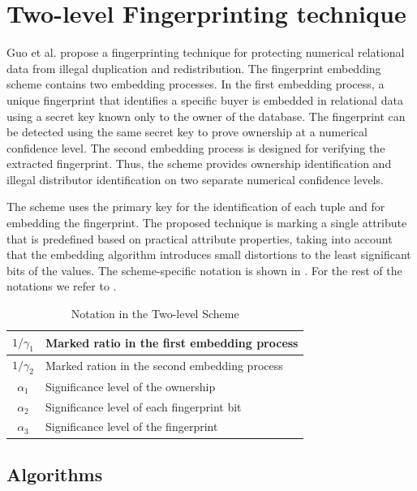 \section{Two-level Fingerprinting technique}\label{sec:two-level-fp}
Guo et al. \cite{guo2006fingerprinting} propose a fingerprinting technique for protecting numerical relational data from illegal duplication and redistribution. 
The fingerprint embedding scheme contains two embedding processes. 
In the first embedding process, a unique fingerprint that identifies a specific buyer is embedded in relational data using a secret key known only to the owner of the database.
The fingerprint can be detected using the same secret key to prove ownership at a numerical confidence level. 
The second embedding process is designed for verifying the extracted fingerprint. 
Thus, the scheme provides ownership identification and illegal distributor identification on two separate numerical confidence levels. 

The scheme uses the primary key for the identification of each tuple and for embedding the fingerprint. 
The proposed technique is marking a single attribute that is predefined based on practical attribute properties, taking into account that the embedding algorithm introduces small distortions to the least significant bits of the values. 
The scheme-specific notation is shown in . For the rest of the notations we refer to .

\begin{table}[ht]
    \centering
    \caption{Notation in the Two-level Scheme}
    \label{tab:two-level-fingerprint-notation}
    \begin{tabular}{|c|l|}
        \hline
         $1/\gamma_1$ & Marked ratio in the first embedding process  \\
         \hline
         $1/\gamma_2$ & Marked ration in the second embedding process \\
         \hline
         $\alpha_1$ & Significance level of the ownership\\
         \hline
         $\alpha_2$ & Significance level of each fingerprint bit \\
         \hline
         $\alpha_3$ & Significance level of the fingerprint \\
         \hline
    \end{tabular}
\end{table}

\subsection{Algorithms}

